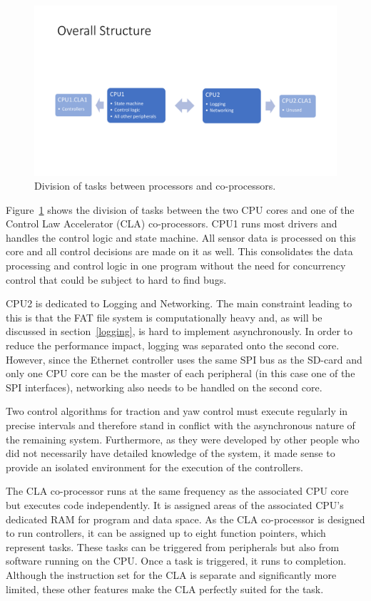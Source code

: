 \begin{figure}[H]
    \centering \includegraphics[width=1.0\textwidth]{./figures/system_structure.pdf}
    \caption{Division of tasks between processors and co-processors.}
    \label{fig:system_structure}
\end{figure}

Figure~\ref{fig:system_structure} shows the division of tasks between the two CPU cores and one of the Control Law Accelerator (CLA) co-processors. CPU1 runs most drivers and handles the control logic and state machine. All sensor data is processed on this core and all control decisions are made on it as well. This consolidates the data processing and control logic in one program without the need for concurrency control that could be subject to hard to find bugs.

CPU2 is dedicated to Logging and Networking. The main constraint leading to this is that the FAT file system is computationally heavy and, as will be discussed in section~\ref{logging}, is hard to implement asynchronously. In order to reduce the performance impact, logging was separated onto the second core. However, since the Ethernet controller uses the same SPI bus as the SD-card and only one CPU core can be the master of each peripheral (in this case one of the SPI interfaces), networking also needs to be handled on the second core.

Two control algorithms for traction and yaw control must execute regularly in precise intervals and therefore stand in conflict with the asynchronous nature of the remaining system. Furthermore, as they were developed by other people who did not necessarily have detailed knowledge of the system, it made sense to provide an isolated environment for the execution of the controllers.

The CLA co-processor runs at the same frequency as the associated CPU core but executes code independently. It is assigned areas of the associated CPU's dedicated RAM for program and data space. As the CLA co-processor is designed to run controllers, it can be assigned up to eight function pointers, which represent tasks. These tasks can be triggered from peripherals but also from software running on the CPU. Once a task is triggered, it runs to completion. Although the instruction set for the CLA is separate and significantly more limited, these other features make the CLA perfectly suited for the task.

